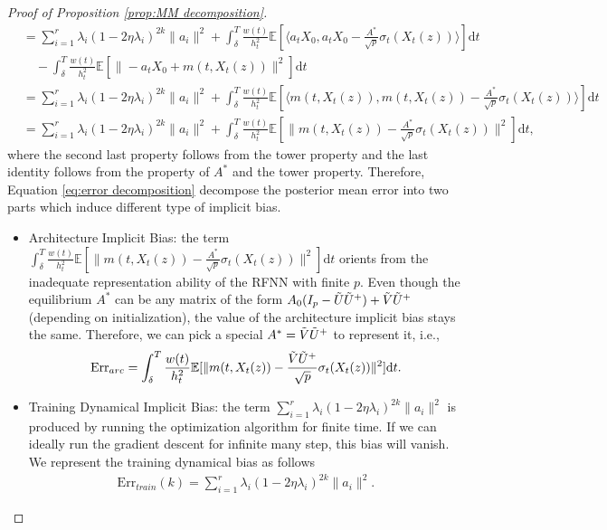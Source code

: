\documentclass[11pt]{article}
\newcommand{\mb}{\mathbb}
\newcommand{\dee}{\mathrm{d}}
\newcommand{\Err}{\mathrm{Err}}
\begin{document}
\begin{proof}[Proof of Proposition \ref{prop:MM decomposition}]
\begin{align}
    &  =  \sum_{i=1}^r \lambda_i (1-2\eta \lambda_i)^{2k}\| a_i \|^2 +  \int_\delta^T \frac{w(t)}{h_t^2}\mb{E}[  \langle a_t X_0, a_t X_0 -\frac{A^*}{\sqrt{p}}\sigma_t(X_t(z))  \rangle ] \dee t \nonumber\\
    &\quad - \int_\delta^T \frac{w(t)}{h_t^2}\mb{E}[  \| -a_t X_0 + m(t,X_t(z)) \|^2 ] \dee t \nonumber\\
    &  =  \sum_{i=1}^r \lambda_i (1-2\eta \lambda_i)^{2k}\| a_i \|^2 +  \int_\delta^T \frac{w(t)}{h_t^2}\mb{E}[  \langle m(t,X_t(z)), m(t,X_t(z))-\frac{A^*}{\sqrt{p}}\sigma_t(X_t(z))  \rangle ] \dee t \nonumber\\
    &  =  \sum_{i=1}^r \lambda_i (1-2\eta \lambda_i)^{2k}\| a_i \|^2 +  \int_\delta^T \frac{w(t)}{h_t^2}\mb{E}[  \| m(t,X_t(z))-\frac{A^*}{\sqrt{p}}\sigma_t(X_t(z))  \|^2 ] \dee t, 
\end{align}
where the second last property follows from the tower property and the last identity follows from the property of $A^*$ and the tower property. Therefore, Equation \eqref{eq:error decomposition} decompose the posterior mean error into two parts which induce different type of implicit bias.
\begin{itemize}
    \item [(1)] Architecture Implicit Bias: the term $\int_\delta^T \frac{w(t)}{h_t^2}\mb{E}[  \| m(t,X_t(z))-\frac{A^*}{\sqrt{p}}\sigma_t(X_t(z))  \|^2 ] \dee t$ orients from the inadequate representation ability of the RFNN with finite $p$. Even though the equilibrium $A^*$ can be any matrix of the form $A_0(I_p  - \Tilde{U}\Tilde{U}^+) + \Tilde{V}\Tilde{U}^+$ (depending on initialization), the value of the architecture implicit bias stays the same. Therefore, we can pick a special $A^*=\Tilde{V}\Tilde{U}^+$ to represent it, i.e.,
    \begin{align*}
        \Err_{arc} = \int_\delta^T \frac{w(t)}{h_t^2}\mb{E}[  \| m(t,X_t(z))-\frac{\Tilde{V}\Tilde{U}^+}{\sqrt{p}}\sigma_t(X_t(z))  \|^2 ] \dee t.
    \end{align*}
    \item [(2)] Training Dynamical Implicit Bias: the term $\sum_{i=1}^r \lambda_i (1-2\eta \lambda_i)^{2k}\| a_i \|^2$ is produced by running the optimization algorithm for finite time. If we can ideally run the gradient descent for infinite many step, this bias will vanish. We represent the training dynamical bias as follows
    \begin{align*}
        \Err_{train}(k) = \sum_{i=1}^r \lambda_i (1-2\eta \lambda_i)^{2k}\| a_i \|^2.
    \end{align*} 
\end{itemize}   
\end{proof}
\end{document}
